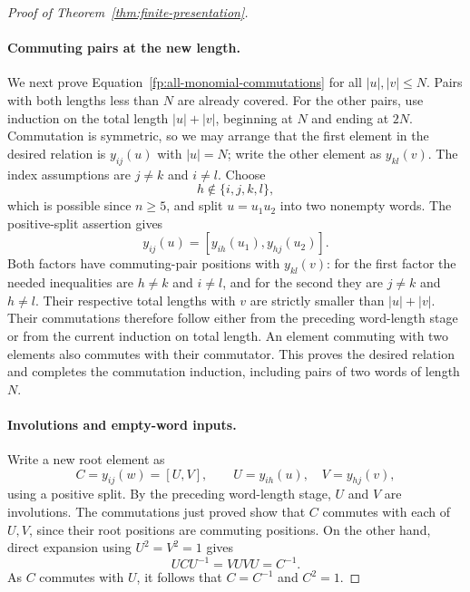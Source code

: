\begin{proof}[Proof of Theorem~\ref{thm:finite-presentation}]
\paragraph{Commuting pairs at the new length.}
We next prove Equation~\eqref{fp:all-monomial-commutations} for all
$|u|,|v|\leq N$.  Pairs with both lengths less than $N$ are already
covered.  For the other pairs, use induction on the total length
$|u|+|v|$, beginning at $N$ and ending at $2N$.  Commutation is
symmetric, so we may arrange that the first element in the desired
relation is $y_{ij}(u)$ with $|u|=N$; write the other element as
$y_{kl}(v)$.  The index assumptions are $j\neq k$ and $i\neq l$.
Choose
\[
 h\notin\{i,j,k,l\},
\]
which is possible since $n\geq5$, and split $u=u_1u_2$ into two
nonempty words.  The positive-split assertion gives
\[
 y_{ij}(u)=[y_{ih}(u_1),y_{hj}(u_2)].
\]
Both factors have commuting-pair positions with $y_{kl}(v)$:
for the first factor the needed inequalities are $h\neq k$ and
$i\neq l$, and for the second they are $j\neq k$ and $h\neq l$.
Their respective total lengths with $v$ are strictly smaller than
$|u|+|v|$.  Their commutations therefore follow either from the preceding
word-length stage or from the current induction on total length.
An element commuting with two elements also commutes with their
commutator.  This proves the desired relation and completes the
commutation induction, including pairs of two words of length $N$.

\paragraph{Involutions and empty-word inputs.}
Write a new root element as
\[
 C=y_{ij}(w)=[U,V],\qquad
 U=y_{ih}(u),\quad V=y_{hj}(v),
\]
using a positive split.  By the preceding word-length stage, $U$ and
$V$ are involutions.  The commutations just proved show that $C$
commutes with each of $U,V$, since their root positions are commuting
positions.  On the other hand, direct expansion using $U^2=V^2=1$
gives
\[
 UCU^{-1}=VUVU=C^{-1}.
\]
As $C$ commutes with $U$, it follows that $C=C^{-1}$ and $C^2=1$.


\end{proof}
